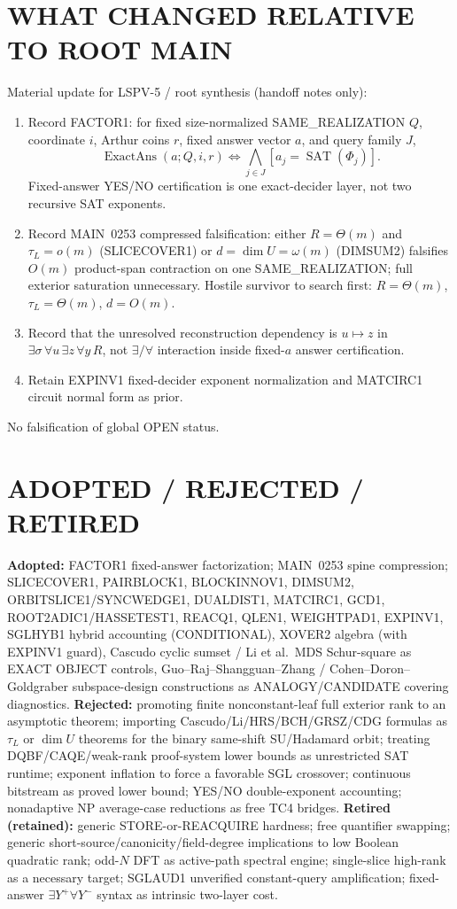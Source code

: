 \documentclass[11pt]{article}
\begin{document}
\section*{WHAT CHANGED RELATIVE TO ROOT MAIN}
Material update for LSPV-5 / root synthesis (handoff notes only):
\begin{enumerate}
\item Record FACTOR1: for fixed size-normalized SAME\_REALIZATION $Q$, coordinate $i$,
Arthur coins $r$, fixed answer vector $a$, and query family $J$,
\[
\operatorname{ExactAns}(a;Q,i,r)\iff\bigwedge_{j\in J}[a_j=\operatorname{SAT}(\Phi_j)].
\]
Fixed-answer YES/NO certification is one exact-decider layer, not two recursive SAT exponents.
\item Record MAIN~0253 compressed falsification: either $R=\Theta(m)$ and $\tau_L=o(m)$
(SLICECOVER1) or $d=\dim U=\omega(m)$ (DIMSUM2) falsifies $O(m)$ product-span contraction
on one SAME\_REALIZATION; full exterior saturation unnecessary. Hostile survivor to search first:
$R=\Theta(m)$, $\tau_L=\Theta(m)$, $d=O(m)$.
\item Record that the unresolved reconstruction dependency is $u\mapsto z$ in
$\exists\sigma\,\forall u\,\exists z\,\forall y\,R$, not $\exists/\forall$ interaction inside
fixed-$a$ answer certification.
\item Retain EXPINV1 fixed-decider exponent normalization and MATCIRC1 circuit normal form as prior.
\end{enumerate}
No falsification of global OPEN status.

\section*{ADOPTED / REJECTED / RETIRED}
\textbf{Adopted:} FACTOR1 fixed-answer factorization; MAIN~0253 spine compression;
SLICECOVER1, PAIRBLOCK1, BLOCKINNOV1, DIMSUM2, ORBITSLICE1/SYNCWEDGE1, DUALDIST1, MATCIRC1,
GCD1, ROOT2ADIC1/HASSETEST1, REACQ1, QLEN1, WEIGHTPAD1, EXPINV1, SGLHYB1 hybrid accounting
(CONDITIONAL), XOVER2 algebra (with EXPINV1 guard), Cascudo cyclic sumset / Li et al.\ MDS
Schur-square as EXACT OBJECT controls, Guo--Raj--Shangguan--Zhang / Cohen--Doron--Goldgraber
subspace-design constructions as ANALOGY/CANDIDATE covering diagnostics.
\textbf{Rejected:} promoting finite nonconstant-leaf full exterior rank to an asymptotic theorem;
importing Cascudo/Li/HRS/BCH/GRSZ/CDG formulas as $\tau_L$ or $\dim U$ theorems for the
binary same-shift SU/Hadamard orbit; treating DQBF/CAQE/weak-rank proof-system lower bounds as
unrestricted SAT runtime; exponent inflation to force a favorable SGL crossover; continuous
bitstream as proved lower bound; YES/NO double-exponent accounting; nonadaptive NP average-case
reductions as free TC4 bridges.
\textbf{Retired (retained):} generic STORE-or-REACQUIRE hardness; free quantifier swapping;
generic short-source/canonicity/field-degree implications to low Boolean quadratic rank;
odd-$N$ DFT as active-path spectral engine; single-slice high-rank as a necessary target;
SGLAUD1 unverified constant-query amplification; fixed-answer $\exists Y^+\forall Y^-$ syntax as
intrinsic two-layer cost.
\end{document}

